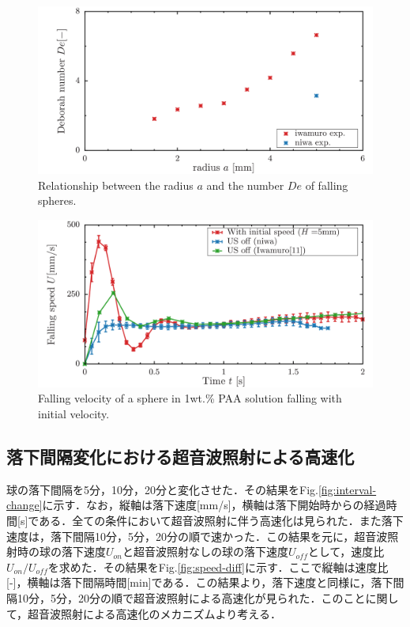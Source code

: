 \begin{figure}[ht]
    \begin{center}
        \includegraphics[width=15cm,clip]{5-Discussion/Deborah.png}
        \caption{Relationship between the radius $a$ and the number $De$ of falling spheres.}
        \label{fig:a-Degraph}
    \end{center}
\end{figure}

\begin{figure}[ht]
    \begin{center}
        \includegraphics[width=15cm,clip]{5-Discussion/h-5.png}
        \caption{Falling velocity of a sphere in 1wt.\% PAA solution falling with initial velocity.}
        \label{fig:h-5}
    \end{center}
\end{figure}

\clearpage

\subsection{落下間隔変化における超音波照射による高速化}

球の落下間隔を5分，10分，20分と変化させた．その結果をFig.\ref{fig:interval-change}に示す．なお，縦軸は落下速度[mm/s]，横軸は落下開始時からの経過時間[s]である．全ての条件において超音波照射に伴う高速化は見られた．また落下速度は，落下間隔10分，5分，20分の順で速かった．この結果を元に，超音波照射時の球の落下速度$U_{on}$と超音波照射なしの球の落下速度$U_{off}$として，速度比$U_{on}/U_{off}$を求めた．その結果をFig.\ref{fig:speed-diff}に示す．ここで縦軸は速度比[-]，横軸は落下間隔時間[min]である．この結果より，落下速度と同様に，落下間隔10分，5分，20分の順で超音波照射による高速化が見られた．このことに関して，超音波照射による高速化のメカニズムより考える．

